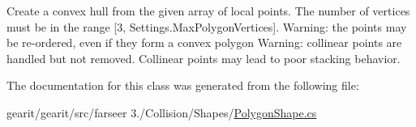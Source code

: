 Create a convex hull from the given array of local points. The number of vertices must be in the range \mbox{[}3, Settings.\+Max\+Polygon\+Vertices\mbox{]}. Warning\+: the points may be re-\/ordered, even if they form a convex polygon Warning\+: collinear points are handled but not removed. Collinear points may lead to poor stacking behavior. 



The documentation for this class was generated from the following file\+:\begin{DoxyCompactItemize}
\item 
gearit/gearit/src/farseer 3./\+Collision/\+Shapes/\hyperlink{_polygon_shape_8cs}{Polygon\+Shape.\+cs}\end{DoxyCompactItemize}
